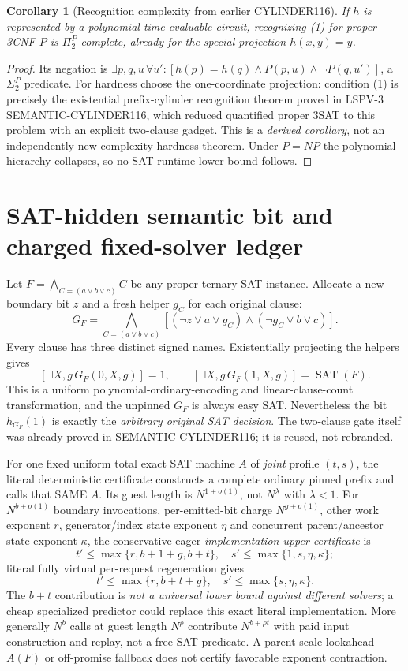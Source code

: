 \documentclass[11pt]{article}
\newtheorem{corollary}[theorem]{Corollary}
\newcommand{\SAT}{\operatorname{SAT}}
\begin{document}
\begin{corollary}[Recognition complexity from earlier CYLINDER116]
If $h$ is represented by a polynomial-time evaluable circuit,
recognizing (1) for proper-3CNF $P$ is $\Pi_2^P$-complete,
already for the special projection $h(x,y)=y$.
\end{corollary}
\begin{proof}
Its negation is
$\exists p,q,u\,\forall u':
[h(p)=h(q)\wedge P(p,u)\wedge\neg P(q,u')]$,
a $\Sigma_2^P$ predicate. For hardness choose the one-coordinate
projection: condition (1) is precisely the existential
prefix-cylinder recognition theorem proved in
LSPV-3 SEMANTIC-CYLINDER116, which reduced quantified
proper 3SAT to this problem with an explicit two-clause gadget.
This is a \emph{derived corollary}, not an independently
new complexity-hardness theorem. Under $P=NP$ the polynomial
hierarchy collapses, so no SAT runtime lower bound follows.
\end{proof}

\section{SAT-hidden semantic bit and charged fixed-solver ledger}
Let $F=\bigwedge_{C=(a\vee b\vee c)}C$ be any proper ternary
SAT instance. Allocate a new boundary bit $z$ and
a fresh helper $g_C$ for each original clause:
\[
G_F=\bigwedge_{C=(a\vee b\vee c)}
  [(\neg z\vee a\vee g_C)\wedge(\neg g_C\vee b\vee c)].\tag{3}
\]
Every clause has three distinct signed names. Existentially
projecting the helpers gives
\[
 [\exists X,g\,G_F(0,X,g)]=1,\qquad
 [\exists X,g\,G_F(1,X,g)]=\SAT(F).                 \tag{4}
\]
This is a uniform polynomial-ordinary-encoding and linear-clause-count
transformation, and the unpinned $G_F$ is always easy SAT.
Nevertheless the bit $h_{G_F}(1)$ is exactly the \emph{arbitrary
original SAT decision}. The two-clause gate itself was already
proved in SEMANTIC-CYLINDER116; it is reused, not rebranded.

For one fixed uniform total exact SAT machine $A$ of \emph{joint}
profile $(t,s)$, the literal deterministic certificate
constructs a complete ordinary pinned prefix and calls
that SAME $A$. Its guest length is $N^{1+o(1)}$, not
$N^{\lambda}$ with $\lambda<1$.
For $N^{b+o(1)}$ boundary invocations,
per-emitted-bit charge $N^{g+o(1)}$, other work exponent $r$,
generator/index state exponent $\eta$ and concurrent
parent/ancestor state exponent $\kappa$, the conservative
eager \emph{implementation upper certificate} is
\[
t'\le\max\{r,b+1+g,b+t\},\quad
s'\le\max\{1,s,\eta,\kappa\};                       \tag{5}
\]
literal fully virtual per-request regeneration gives
\[
t'\le\max\{r,b+t+g\},\quad
s'\le\max\{s,\eta,\kappa\}.                         \tag{6}
\]
The $b+t$ contribution is \emph{not a universal lower bound
against different solvers}; a cheap specialized predictor
could replace this exact literal implementation.
More generally $N^b$ calls at guest length $N^\rho$
contribute $N^{b+\rho t}$ with paid input construction and
replay, not a free SAT predicate.
A parent-scale lookahead $A(F)$ or off-promise fallback
does not certify favorable exponent contraction.
\end{document}
